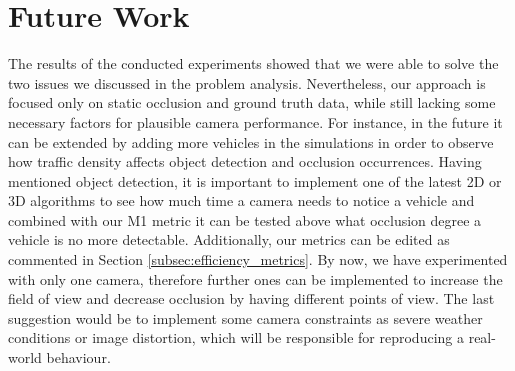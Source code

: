 \section{Future Work}

The results of the conducted experiments showed that we were able to solve the two issues we discussed in the problem analysis. Nevertheless, our approach is focused only on static occlusion and ground truth data, while still lacking some necessary factors for plausible camera performance. For instance, in the future it can be extended by adding more vehicles in the simulations in order to observe how traffic density affects object detection and occlusion occurrences. Having mentioned object detection, it is important to implement one of the latest 2D or 3D algorithms to see how much time a camera needs to notice a vehicle and combined with our M1 metric it can be tested above what occlusion degree a vehicle is no more detectable. Additionally, our metrics can be edited as commented in Section \ref{subsec:efficiency_metrics}. By now, we have experimented with only one camera, therefore further ones can be implemented to increase the field of view and decrease occlusion by having different points of view. The last suggestion would be to implement some camera constraints as severe weather conditions or image distortion, which will be responsible for reproducing a real-world behaviour.